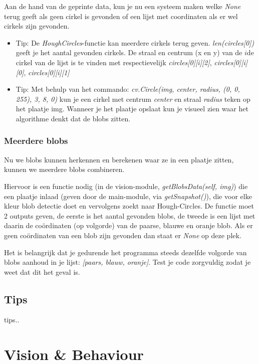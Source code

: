 \documentclass[a4paper, twoside]{article}
\begin{document}
Aan de hand van de geprinte data, kun je nu een systeem maken welke \textit{None} terug geeft als geen cirkel is gevonden of een lijst met coordinaten als er wel cirkels zijn gevonden.

\begin{itemize}
\item Tip: De \textit{HoughCircles}-functie kan meerdere cirkels terug geven. \textit{len(circles[0])} geeft je het aantal gevonden cirkels. De straal en centrum (x en y) van de $i${de} cirkel van de lijst is te vinden met respectievelijk \textit{circles[0][i][2]}, \textit{circles[0][i][0]}, \textit{circles[0][i][1]}
\item Tip: Met behulp van het commando: \textit{cv.Circle(img, center, radius, (0, 0, 255), 3, 8, 0)} kun je een cirkel met centrum \textit{center} en straal \textit{radius} teken op het plaatje img. Wanneer je het plaatje opslaat kun je visueel zien waar het algorithme denkt dat de blobs zitten.
\end{itemize}

\subsubsection{Meerdere blobs}
Nu we blobs kunnen herkennen en berekenen waar ze in een plaatje zitten, kunnen we meerdere blobs combineren.

Hiervoor is een functie nodig (in de vision-module, \textit{getBlobsData(self, img)}) die een plaatje inlaad (geven door de main-module, via \textit{getSnapshot()}), die voor elke kleur blob detectie doet en vervolgens zoekt  naar Hough-Circles. De functie moet 2 outputs geven, de eerste is het aantal gevonden blobs, de tweede is een lijst met daarin de co\"ordinaten (op volgorde) van de paarse, blauwe en oranje blob. Als er geen co\"ordinaten van een blob zijn gevonden dan staat er \textit{None} op deze plek. 

Het is belangrijk dat je gedurende het programma steeds dezelfde volgorde van blobs aanhoud in je lijst: \textit{[paars, blauw, oranje]}. Test je code zorgvuldig zodat je weet dat dit het geval is.

\subsection{Tips}
tips..


\cleardoublepage
\section{Vision \& Behaviour}
\end{document}
